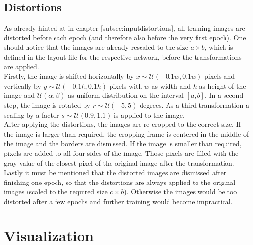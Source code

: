\documentclass[11pt, a4paper]{article}
\newcommand\closedInt[2]{\left[#1,#2\right]}
\begin{document}
\begin{appendix}
	\subsection{Distortions}
	\label{sec:implementation-distortions}
	As already hinted at in chapter \ref{subsec:inputdistortions}, all training images are distorted before each epoch (and therefore also before the very first epoch).
	One should notice that the images are already rescaled to the size $a \times b$, which is defined in the layout file for the respective network, before the transformations are applied.\\
	Firstly, the image is shifted horizontally by $x \sim \mathcal{U}(- 0.1 w, 0.1 w)$ pixels and vertically by $y \sim \mathcal{U}(- 0.1 h, 0.1 h)$ pixels with $w$ as width and $h$ as height of the image and $\mathcal{U}(\alpha,\beta)$ as uniform distribution on the interval $\closedInt{a}{b}$. In a second step, the image is rotated by $r \sim \mathcal{U}(-5, 5)$ degrees. As a third transformation a scaling by a factor $s \sim \mathcal{U}(0.9,1.1)$ is applied to the image.\\
	After applying the distortions, the images are re-cropped to the correct size. If the image is larger than required, the cropping frame is centered in the middle of the image and the borders are dismissed. If the image is smaller than required, pixels are added to all four sides of the image. Those pixels are filled with the gray value of the closest pixel of the original image after the transformation.\\
	Lastly it must be mentioned that the distorted images are dismissed after finishing one epoch, so that the distortions are always applied to the original images (scaled to the required size $a \times b$). Otherwise the images would be too distorted after a few epochs and further training would become impractical.
	
	\section{Visualization}
	

\end{appendix}
\end{document}
